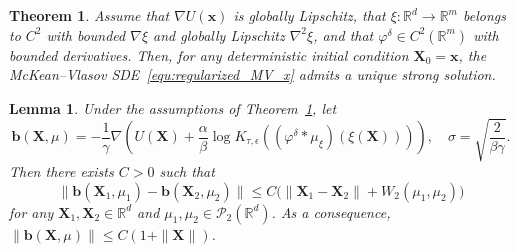 \documentclass[10pt,a4paper]{amsart}
\newtheorem{theorem}{Theorem}
\newtheorem{lemma}{Lemma}
\def\bX{\mathbf{X}}
\def\bb{\mathbf{b}}
\def\bx{\mathbf{x}}
\begin{document}
\begin{theorem}\label{thm:mk_well}
Assume that $\nabla U(\bx)$ is globally Lipschitz, that $\xi:\mathbb R^{d}\to\mathbb R^m$ belongs to $C^2$ with bounded $\nabla \xi$ and globally Lipschitz $\nabla^2 \xi$, and that $\varphi^\delta\in C^2(\mathbb R^m)$ with bounded derivatives. 
Then, for any deterministic initial condition \(\bX_0=\bx\), the McKean--Vlasov SDE~\eqref{equ:regularized_MV_x} admits a unique strong solution.
\end{theorem}

\begin{lemma} \label{lem:lip_cont}
Under the assumptions of Theorem~\ref{thm:mk_well},
let 
\begin{equation}
\bb(\bX,\mu)
=
-\frac{1}{\gamma}\nabla \left( U(\bX)
+
\frac{\alpha}{\beta}
\log\!
K_{\tau,\epsilon}\left((\varphi^\delta * \mu_{\xi})(\xi(\bX))\right)
\right), \quad \sigma = \sqrt{\frac{2}{\beta\gamma}}.
\label{eq:b_drift}
\end{equation}
Then there exists $C>0$ such that
\begin{equation}\label{equ:lip}
   \|\bb(\bX_1,\mu_1)-\bb(\bX_2,\mu_2)\|
\le
C\Big(\|\bX_1-\bX_2\|+W_2(\mu_1,\mu_2)\Big) 
\end{equation}
for any $\bX_1,\bX_2\in \mathbb R^{d}$ and $\mu_1,\mu_2\in \mathcal P_2(\mathbb{R}^{d})$.
As a consequence, $\|\bb(\bX,\mu)\| \leq C(1+\|\bX\|)$.
\end{lemma}
\end{document}
